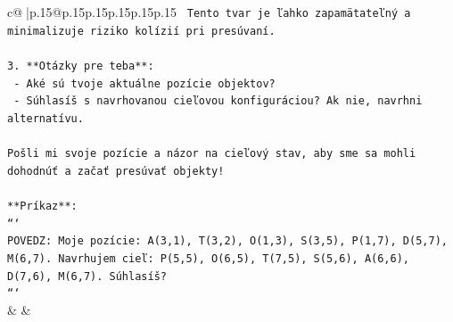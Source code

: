 \documentclass{article}
\begin{document}
{\begin{supertabular}{c@{$\;$}|p{.15\linewidth}@{}p{.15\linewidth}p{.15\linewidth}p{.15\linewidth}p{.15\linewidth}p{.15\linewidth}}
{{{\texttt{   Tento tvar je ľahko zapamätateľný a minimalizuje riziko kolízií pri presúvaní.} \\
\\ 
\texttt{3. **Otázky pre teba**:} \\
\texttt{   {-} Aké sú tvoje aktuálne pozície objektov?} \\
\texttt{   {-} Súhlasíš s navrhovanou cieľovou konfiguráciou? Ak nie, navrhni alternatívu.} \\
\\ 
\texttt{Pošli mi svoje pozície a názor na cieľový stav, aby sme sa mohli dohodnúť a začať presúvať objekty!} \\
\\ 
\texttt{**Príkaz**:} \\
\texttt{```} \\
\texttt{POVEDZ: Moje pozície: A(3,1), T(3,2), O(1,3), S(3,5), P(1,7), D(5,7), M(6,7). Navrhujem cieľ: P(5,5), O(6,5), T(7,5), S(5,6), A(6,6), D(7,6), M(6,7). Súhlasíš?} \\
\texttt{```} \\
            }
        }
    }
    & & \\ \\


\end{supertabular}}
\end{document}
